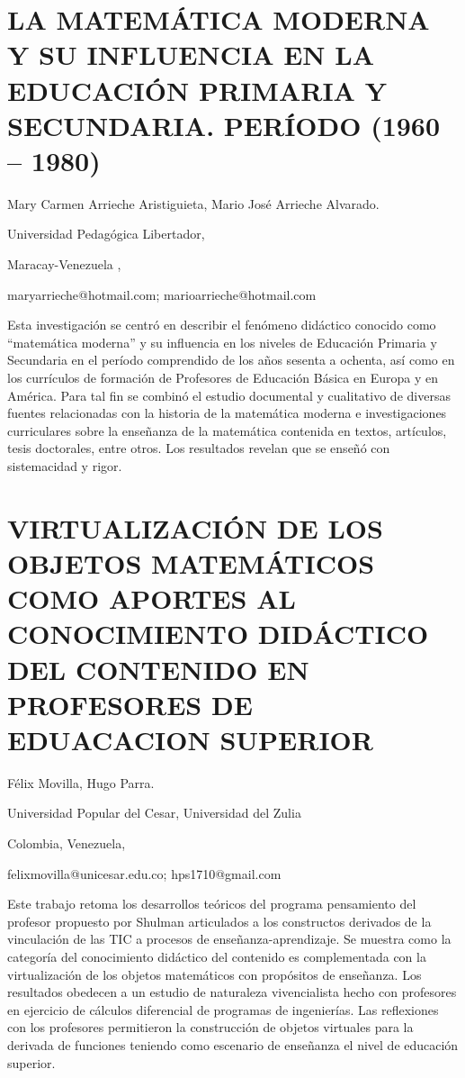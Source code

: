 \section{LA MATEMÁTICA MODERNA Y SU INFLUENCIA EN LA EDUCACIÓN PRIMARIA Y
SECUNDARIA. PERÍODO (1960 – 1980) }

\begin{datos}

Mary Carmen Arrieche Aristiguieta, Mario José Arrieche Alvarado.

Universidad Pedagógica Libertador,

Maracay-Venezuela ,

maryarrieche@hotmail.com; marioarrieche@hotmail.com

\end{datos}

Esta investigación se centró en describir el fenómeno didáctico conocido
como “matemática moderna” y su influencia en los niveles de Educación
Primaria y Secundaria en el período comprendido de los años sesenta
a ochenta, así como en los currículos de formación de Profesores de
Educación Básica en Europa y en América. Para tal fin se combinó el
estudio documental y cualitativo de diversas fuentes relacionadas
con la historia de la matemática moderna e investigaciones curriculares
sobre la enseñanza de la matemática contenida en textos, artículos,
tesis doctorales, entre otros. Los resultados revelan que se enseñó
con sistemacidad y rigor.


\section{VIRTUALIZACIÓN DE LOS OBJETOS MATEMÁTICOS COMO APORTES AL CONOCIMIENTO
DIDÁCTICO DEL CONTENIDO EN PROFESORES DE EDUACACION SUPERIOR}

\begin{datos}

Félix Movilla, Hugo Parra.

Universidad Popular del Cesar, Universidad del Zulia

Colombia, Venezuela,

felixmovilla@unicesar.edu.co; hps1710@gmail.com 

\end{datos}

Este trabajo retoma los desarrollos teóricos del programa pensamiento
del profesor propuesto por Shulman articulados a los constructos derivados
de la vinculación de las TIC a procesos de enseñanza-aprendizaje.
Se muestra como la categoría del conocimiento didáctico del contenido
es complementada con la virtualización de los objetos matemáticos
con propósitos de enseñanza. Los resultados obedecen a un estudio
de naturaleza vivencialista hecho con profesores en ejercicio de cálculos
diferencial de programas de ingenierías. Las reflexiones con los profesores
permitieron la construcción de objetos virtuales para la derivada
de funciones teniendo como escenario de enseñanza el nivel de educación
superior.


